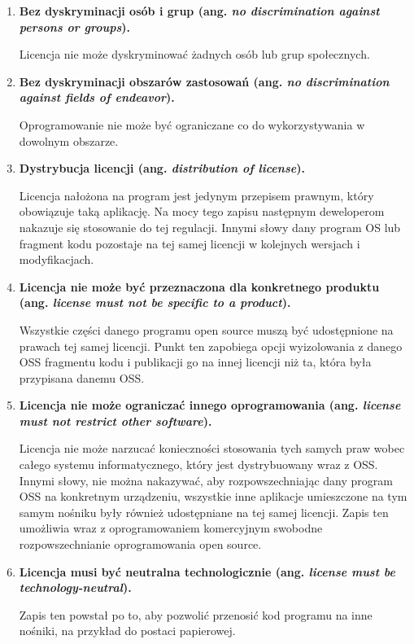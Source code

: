 \documentclass{article}
\begin{document}
\begin{enumerate}
    \item \textbf{Bez dyskryminacji osób i grup (ang. \emph{no discrimination against persons or groups}).}
    
    \hspace{4mm} Licencja nie może dyskryminować żadnych osób lub grup społecznych.
    
    \item \textbf{Bez dyskryminacji obszarów zastosowań (ang. \emph{no discrimination against fields of endeavor}).}
    
    \hspace{4mm} Oprogramowanie nie może być ograniczane co do wykorzystywania w dowolnym obszarze.
    
    \item \textbf{Dystrybucja licencji (ang. \emph{distribution of license}).}
    
    \hspace{4mm} Licencja nałożona na program jest jedynym przepisem prawnym, który obowiązuje taką aplikację. Na mocy tego zapisu następnym deweloperom nakazuje się stosowanie do tej regulacji. Innymi słowy dany program OS lub fragment kodu pozostaje na tej samej licencji w kolejnych wersjach i modyfikacjach.
    
    \item \textbf{Licencja nie może być przeznaczona dla konkretnego produktu (ang. \emph{license must not be specific to a product}).}
    
    \hspace{4mm} Wszystkie części danego programu open source muszą być udostępnione na prawach tej samej licencji. Punkt ten zapobiega opcji wyizolowania z danego OSS fragmentu kodu i publikacji go na innej licencji niż ta, która była przypisana danemu OSS.
    
    \item \textbf{Licencja nie może ograniczać innego oprogramowania (ang. \emph{license must not restrict other software}).}
    
    \hspace{4mm} Licencja nie może narzucać konieczności stosowania tych samych praw wobec całego systemu informatycznego, który jest dystrybuowany wraz z OSS. Innymi słowy, nie można nakazywać, aby rozpowszechniając dany program OSS na konkretnym urządzeniu, wszystkie inne aplikacje umieszczone na tym samym nośniku były również udostępniane na tej samej licencji. Zapis ten umożliwia wraz z oprogramowaniem komercyjnym swobodne rozpowszechnianie oprogramowania open source.
    
    \item \textbf{Licencja musi być neutralna technologicznie (ang. \emph{license must be technology-neutral}).}
    
    \hspace{4mm} Zapis ten powstał po to, aby pozwolić przenosić kod programu na inne nośniki, na przykład do postaci papierowej.
\end{enumerate}
\end{document}
